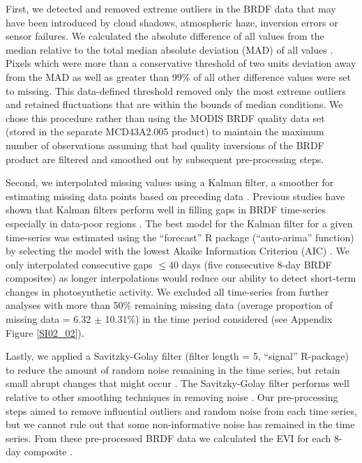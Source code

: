 First, we detected and removed extreme outliers in the BRDF data that may have been introduced by cloud shadows, atmospheric haze, inversion errors or sensor failures. We calculated the absolute difference of all values from the median relative to the total median absolute deviation (MAD) of all values \citep{Leys2013}. Pixels which were more than a conservative threshold of two units deviation \citep[but see][]{Leys2013} away from the MAD as well as greater than 99\% of all other difference values were set to missing. This data-defined threshold removed only the most extreme outliers and retained fluctuations that are within the bounds of median conditions. We chose this procedure rather than using the MODIS BRDF quality data set (stored in the separate MCD43A2.005 product) to maintain the maximum number of observations assuming that bad quality inversions of the BRDF product are filtered and smoothed out by subsequent pre-processing steps.

Second, we interpolated missing values using a Kalman filter, a smoother for estimating missing data points based on preceding data \citep{Kalman1960}. Previous studies have shown that Kalman filters perform well in filling gaps in BRDF time-series especially in data-poor regions \citep{Samain2008}. The best model for the Kalman filter for a given time-series was estimated using the “forecast” R package (“auto-arima” function) by selecting the model with the lowest Akaike Information Criterion (AIC) \citep{Hyndman2008}. We only interpolated consecutive gaps $\leq 40$ days (\ie five consecutive 8-day BRDF composites) as longer interpolations would reduce our ability to detect short-term changes in photosynthetic activity.  We excluded all time-series from further analyses with more than 50\% remaining missing data (average proportion of missing data = 6.32 $\pm$ 10.31\%) in the time period considered (see Appendix Figure \ref{SI02_02}). 

Lastly, we applied a Savitzky-Golay filter (filter length = 5, “signal” R-package) to reduce the amount of random noise remaining in the time series, but retain small abrupt changes that might occur \citep{Joensson2004}. The Savitzky-Golay filter performs well relative to other smoothing techniques in removing noise \citep{Kandasamy2013}. Our pre-processing steps aimed to remove influential outliers and random noise from each time series, but we cannot rule out that some non-informative noise has remained in the time series. From these pre-processed BRDF data we calculated the EVI for each 8-day composite \citep{Jiang2008}.

